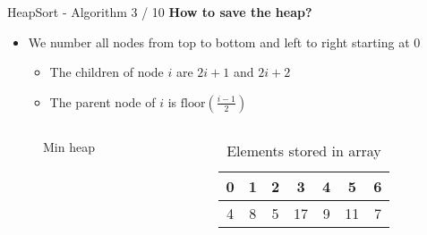 
\begin{frame}{HeapSort - Algorithm 3 / 10}
  \textbf{How to save the heap?}\\[0.25em]
  \begin{itemize}
    \item
      We number all nodes from top to bottom and left to right starting at
      {\color{Mittel-Blau}0}
      \begin{itemize}
        \item
          The children of node {\color{Mittel-Blau}$i$} are
          {\color{Mittel-Blau}$2i + 1$} and {\color{Mittel-Blau}$2i + 2$}
        \vspace*{0.5em}
        \item
          The parent node of {\color{Mittel-Blau}$i$} is
          {\color{Mittel-Blau}$\mathrm{floor}\left(\frac{i-1}{2}\right)$}
      \end{itemize}
  \end{itemize}%
  \vspace*{-1.5em}%
  \begin{columns}%
    \begin{column}{0.5\textwidth}
      \begin{figure}[!h]%
        \begin{adjustbox}{width=\linewidth}
        \end{adjustbox}
        \vspace*{-0.5em}%
        \caption{Min heap}%
        \label{fig:minheap_numbered}%
      \end{figure}%
    \end{column}
    \begin{column}{0.5\textwidth}
      \begin{table}[!h]
        \caption{Elements stored in array}
        \label{tab:minheap_numbered}
        \begin{tabular}{ccccccc}
          {\color{Mittel-Gruen}0}&
          {\color{Mittel-Gruen}1}&
          {\color{Mittel-Gruen}2}&
          {\color{Mittel-Gruen}3}&
          {\color{Mittel-Gruen}4}&
          {\color{Mittel-Gruen}5}&
          {\color{Mittel-Gruen}6}\\
          \hline
          \multicolumn{1}{|c}{4}&%
          \multicolumn{1}{|c}{8}&%
          \multicolumn{1}{|c}{5}&%
          \multicolumn{1}{|c}{17}&%
          \multicolumn{1}{|c}{9}&%
          \multicolumn{1}{|c}{11}&%
          \multicolumn{1}{|c|}{7}\\
          \hline
        \end{tabular}
      \end{table}
    \end{column}
  \end{columns}
\end{frame}

